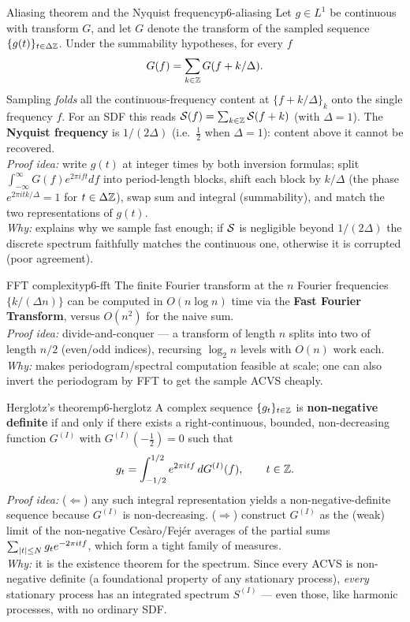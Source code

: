 \begin{theorem}{Aliasing theorem and the Nyquist frequency}{p6-aliasing}
Let $g\in L^1$ be continuous with transform $G$, and let $G$ denote the
transform of the sampled sequence $\{g(t)\}_{t\in\Delta\mathbb{Z}}$. Under the
summability hypotheses, for every $f$
\[
G(f)=\sum_{k\in\mathbb{Z}} G(f+k/\Delta).
\]
Sampling \emph{folds} all the continuous-frequency content at
$\{f+k/\Delta\}_{k}$ onto the single frequency $f$. For an SDF this reads
$\mathcal{S}(f)=\sum_{k\in\mathbb{Z}}\mathcal{S}(f+k)$ (with $\Delta=1$). The
\textbf{Nyquist frequency} is $1/(2\Delta)$ (i.e.\ $\tfrac12$ when
$\Delta=1$): content above it cannot be recovered.\\[2pt]
\textit{Proof idea:} write $g(t)$ at integer times by both inversion formulas;
split $\int_{-\infty}^{\infty}G(f)e^{2\pi i f t}df$ into period-length blocks,
shift each block by $k/\Delta$ (the phase $e^{2\pi i t k/\Delta}=1$ for
$t\in\Delta\mathbb{Z}$), swap sum and integral (summability), and match the two
representations of $g(t)$.\\
\textit{Why:} explains why we sample fast enough; if $\mathcal{S}$ is negligible
beyond $1/(2\Delta)$ the discrete spectrum faithfully matches the continuous
one, otherwise it is corrupted (poor agreement).
\end{theorem}

\begin{proposition}{FFT complexity}{p6-fft}
The finite Fourier transform at the $n$ Fourier frequencies $\{k/(\Delta n)\}$
can be computed in $O(n\log n)$ time via the \textbf{Fast Fourier Transform},
versus $O(n^2)$ for the naive sum.\\[2pt]
\textit{Proof idea:} divide-and-conquer --- a transform of length $n$ splits
into two of length $n/2$ (even/odd indices), recursing $\log_2 n$ levels with
$O(n)$ work each.\\
\textit{Why:} makes periodogram/spectral computation feasible at scale; one
can also invert the periodogram by FFT to get the sample ACVS cheaply.
\end{proposition}

\begin{theorem}{Herglotz's theorem}{p6-herglotz}
A complex sequence $\{g_t\}_{t\in\mathbb{Z}}$ is \textbf{non-negative definite} if
and only if there exists a right-continuous, bounded, non-decreasing function
$G^{(I)}$ with $G^{(I)}(-\tfrac12)=0$ such that
\[
g_t=\int_{-1/2}^{1/2} e^{2\pi i t f}\,dG^{(I)}(f),\qquad t\in\mathbb{Z} .
\]
\textit{Proof idea:} ($\Leftarrow$) any such integral representation yields a
non-negative-definite sequence because $G^{(I)}$ is non-decreasing.
($\Rightarrow$) construct $G^{(I)}$ as the (weak) limit of the non-negative
Ces\`aro/Fej\'er averages of the partial sums $\sum_{\left\lvert t \right\rvert\le N} g_t
e^{-2\pi i t f}$, which form a tight family of measures.\\
\textit{Why:} it is the existence theorem for the spectrum. Since every ACVS is
non-negative definite (a foundational property of any stationary process),
\emph{every} stationary process has an integrated spectrum $S^{(I)}$ --- even
those, like harmonic processes, with no ordinary SDF.
\end{theorem}

